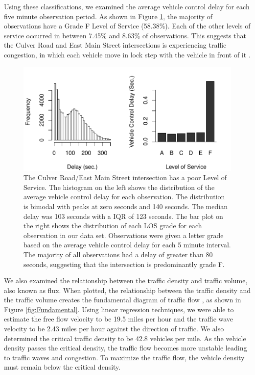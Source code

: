 \documentclass{report}
\begin{document}
Using these classifications, we examined the average vehicle control delay for
each five minute observation period. As shown in Figure \ref{fig:LOSfigure},
the majority of observations have a Grade F Level of Service (58.38\%). Each of
the other levels of service occurred in between 7.45\% and 8.63\% of observations.
This suggests that the Culver Road and East Main Street intersections is
experiencing traffic congestion, in which each vehicle move in lock step with
the vehicle in front of it \cite{HCM}.

\begin{figure}[h]
\centering
\includegraphics{upstat_report-LOCplot}
\caption{The Culver Road/East Main Street
intersection has a poor Level of Service. The histogram on the left shows the
distribution of the average vehicle control delay for each observation. The
distribution is bimodal with peaks at zero seconds and 140 seconds. The median
delay was 103 seconds with a IQR of
123 seconds. The bar plot on the right shows the
distribution of each LOS grade for each observation in our data set.
Observations were given a letter grade based on the average vehicle control
delay for each 5 minute interval. The majority of all observations had a delay
of greater than 80 seconds, suggesting that the intersection is predominantly grade
F.}
\label{fig:LOSfigure}
\end{figure}

We also examined the relationship between the traffic density and traffic volume,
also known as flux. When plotted, the relationship between the traffic density
and the traffic volume creates the fundamental diagram of traffic flow
\cite{HCM}, as shown in Figure \ref{fig:Fundamental}. Using linear regression techniques, we
were able to estimate the free flow velocity to be 19.5 miles per hour and the
traffic wave velocity to be 2.43 miles per hour against the direction of traffic.
We also determined the critical traffic density to be 42.8 vehicles per mile.
As the vehicle density passes the critical density, the traffic flow becomes
more unstable leading to traffic waves and congestion. To maximize
the traffic flow, the vehicle density must remain below the critical density.
\end{document}
